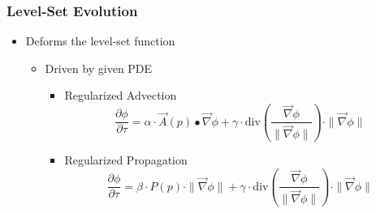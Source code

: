 \begin{frame}
\frametitle{Level-Set Evolution}
\begin{itemize}
  \item Deforms the level-set function
  \begin{itemize}
    \item Driven by given PDE
    \begin{itemize}
      \item<2->Regularized Advection
      \begin{equation*}
      \frac{\partial \phi}{\partial \tau} = 
      \alpha \cdot \overrightarrow{A}(p) \bullet \overrightarrow{\nabla} \phi +
      \gamma \cdot \text{div}\left( \frac{\overrightarrow{\nabla}
      \phi}{\|\overrightarrow{\nabla} \phi\|} \right) \cdot
    \|\overrightarrow{\nabla}
      \phi\|
      \end{equation*}

      \item<3->Regularized Propagation
      \begin{equation*}
      \frac{\partial \phi}{\partial \tau} = 
      \beta \cdot P(p) \cdot \|\overrightarrow{\nabla} \phi \| +
      \gamma \cdot \text{div}\left( \frac{\overrightarrow{\nabla}
      \phi}{\|\overrightarrow{\nabla} \phi\|} \right) \cdot
    \|\overrightarrow{\nabla}
      \phi\|
      \end{equation*}
\end{itemize}
\end{itemize}
\end{itemize}
\end{frame}
